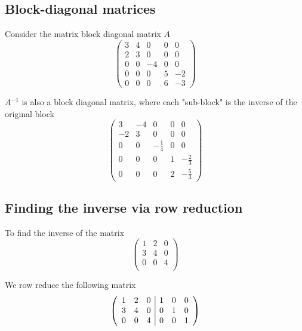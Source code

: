 \subsection{Block-diagonal matrices}
\begin{framed}
   Consider the matrix block diagonal matrix $A$\[
     \begin{pmatrix} 
        3 & 4 & 0 & 0 & 0 \\  
        2 & 3 & 0 & 0 & 0 \\  
        0 & 0 & -4 & 0 & 0 \\  
        0 & 0 & 0 & 5 & -2 \\  
        0 & 0 & 0 & 6 & -3 
     \end{pmatrix}
   \] 

   $A^{-1}$ is also a block diagonal matrix, where each "sub-block" is the inverse of the original block 
   \[
     \begin{pmatrix} 
        3 & -4 & 0 & 0 & 0 \\  
        -2 & 3 & 0 & 0 & 0 \\  
        0 & 0 & - \frac{1}{4} & 0 & 0 \\  
        0 & 0 & 0 & 1 & -\frac{2}{3} \\  
        0 & 0 & 0 & 2 & -\frac{5}{3}
     \end{pmatrix}
   \] 
\end{framed}

\subsection{Finding the inverse via row reduction}
\begin{framed}
   To find the inverse of the matrix \[
     \begin{pmatrix} 
        1 & 2 & 0 \\  
        3 & 4 & 0 \\  
        0 & 0 & 4 \\  
     \end{pmatrix}
   \] 

   We row reduce the following matrix \[ 
  \left( 
      \begin{array}{c c c | c c c}
      1 & 2 & 0 & 1 & 0 & 0\\  
      3 & 4 & 0 & 0 & 1 & 0\\  
      0 & 0 & 4 & 0 & 0 & 1\\  
      \end{array}
  \right) 
   \] 

  
\end{framed}








